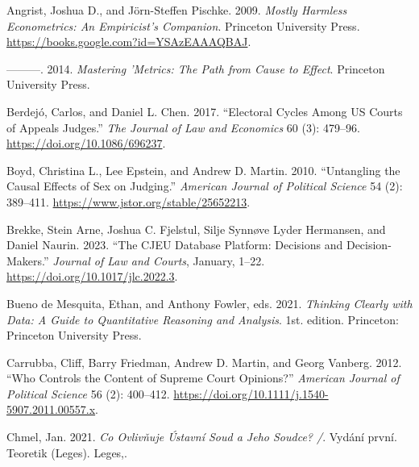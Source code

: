 \documentclass[
  11pt,
]{article}
\newlength{\cslhangindent}
\newenvironment{CSLReferences}[2] %
 {%
  \setlength{\parindent}{0pt}
  \ifodd #1 \everypar{\setlength{\hangindent}{\cslhangindent}}\ignorespaces\fi
  \ifnum #2 > 0
  \setlength{\parskip}{#2\baselineskip}
  \fi
 }%
 {}
\begin{document}
\hypertarget{refs}{}
\begin{CSLReferences}{1}{0}
\leavevmode{}%
Angrist, Joshua D., and Jörn-Steffen Pischke. 2009. \emph{Mostly
{Harmless Econometrics}: {An Empiricist}'s {Companion}}. {Princeton
University Press}. \url{https://books.google.com?id=YSAzEAAAQBAJ}.

\leavevmode{}%
---------. 2014. \emph{Mastering '{Metrics}: {The Path} from {Cause} to
{Effect}}. {Princeton University Press}.

\leavevmode{}%
Berdejó, Carlos, and Daniel L. Chen. 2017. {``Electoral {Cycles} Among
{US Courts} of {Appeals Judges}.''} \emph{The Journal of Law and
Economics} 60 (3): 479--96. \url{https://doi.org/10.1086/696237}.

\leavevmode{}%
Boyd, Christina L., Lee Epstein, and Andrew D. Martin. 2010.
{``Untangling the {Causal Effects} of {Sex} on {Judging}.''}
\emph{American Journal of Political Science} 54 (2): 389--411.
\url{https://www.jstor.org/stable/25652213}.

\leavevmode{}%
Brekke, Stein Arne, Joshua C. Fjelstul, Silje Synnøve Lyder Hermansen,
and Daniel Naurin. 2023. {``The {CJEU Database Platform}: {Decisions}
and {Decision-Makers}.''} \emph{Journal of Law and Courts}, January,
1--22. \url{https://doi.org/10.1017/jlc.2022.3}.

\leavevmode{}%
Bueno de Mesquita, Ethan, and Anthony Fowler, eds. 2021. \emph{Thinking
Clearly with Data: A Guide to Quantitative Reasoning and Analysis}. 1st.
edition. {Princeton}: {Princeton University Press}.

\leavevmode{}%
Carrubba, Cliff, Barry Friedman, Andrew D. Martin, and Georg Vanberg.
2012. {``Who {Controls} the {Content} of {Supreme Court Opinions}?''}
\emph{American Journal of Political Science} 56 (2): 400--412.
\url{https://doi.org/10.1111/j.1540-5907.2011.00557.x}.

\leavevmode{}%
Chmel, Jan. 2021. \emph{Co Ovlivňuje {Ústavní} Soud a Jeho Soudce? /}.
Vydání první. Teoretik ({Leges}). {Leges,}.


\end{CSLReferences}
\end{document}
